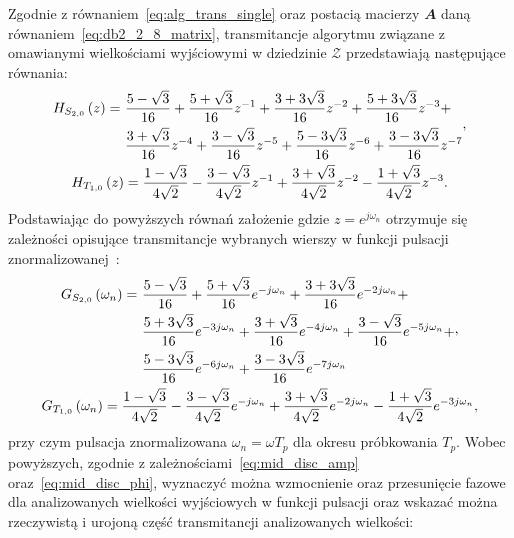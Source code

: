 Zgodnie z równaniem~\eqref{eq:alg_trans_single} oraz postacią macierzy $\mathbfit{A}$ daną równaniem~\eqref{eq:db2_2_8_matrix}, transmitancje algorytmu związane z omawianymi wielkościami wyjściowymi w dziedzinie $\mathcal{Z}$ przedstawiają następujące równania:
\begin{gather}
\begin{split}
H_{S_{2,0}} \left(z\right) = ~
& \frac{5 - \sqrt{3}}{16} + \frac{5 + \sqrt{3}}{16} z^{-1} + \frac{3 + 3 \sqrt{3}}{16} z^{-2} + \frac{5 + 3 \sqrt{3}}{16} z^{-3} + \\
& \frac{3 + \sqrt{3}}{16} z^{-4} + \frac{3 - \sqrt{3}}{16} z^{-5} + \frac{5 - 3 \sqrt{3}}{16} z^{-6} + \frac{3 - 3 \sqrt{3}}{16} z^{-7}
\end{split}
\label{eq:sym_partd_output_trans_z_S_2_0}, \\
H_{T_{1,0}} \left(z\right) = \frac{1 - \sqrt{3}}{4 \sqrt{2}} - \frac{3 - \sqrt{3}}{4 \sqrt{2}} z^{-1} + \frac{3 + \sqrt{3}}{4 \sqrt{2}} z^{-2} - \frac{1 + \sqrt{3}}{4 \sqrt{2}} z^{-3} \label{eq:sym_partd_output_trans_z_T_1_0}.
\end{gather}
Podstawiając do powyższych równań założenie gdzie $z = e^{j\omega_{n}}$ otrzymuje się zależności opisujące transmitancje wybranych wierszy w funkcji pulsacji znormalizowanej~\cite{oppenheim_dsp}:
\begin{gather}
\begin{split}
G_{S_{2,0}} \left(\omega_{n}\right) = ~
& \frac{5 - \sqrt{3}}{16} + \frac{5 + \sqrt{3}}{16} e^{-j\omega_{n}} + \frac{3 + 3 \sqrt{3}}{16} e^{-2j\omega_{n}} + \\
& \frac{5 + 3 \sqrt{3}}{16} e^{-3j\omega_{n}} + \frac{3 + \sqrt{3}}{16} e^{-4j\omega_{n}} + \frac{3 - \sqrt{3}}{16} e^{-5j\omega_{n}} + \\
& \frac{5 - 3 \sqrt{3}}{16} e^{-6j\omega_{n}} + \frac{3 - 3 \sqrt{3}}{16} e^{-7j\omega_{n}}
\end{split}
\label{eq:sym_partd_output_trans_wn_S_2_0}, \\
G_{T_{1,0}} \left(\omega_{n}\right) = \frac{1 - \sqrt{3}}{4 \sqrt{2}} - \frac{3 - \sqrt{3}}{4 \sqrt{2}} e^{-j\omega_{n}} + \frac{3 + \sqrt{3}}{4 \sqrt{2}} e^{-2j\omega_{n}} - \frac{1 + \sqrt{3}}{4 \sqrt{2}} e^{-3j\omega_{n}} \label{eq:sym_partd_output_trans_wn_T_1_0},
\end{gather}
przy czym pulsacja znormalizowana $\omega_{n} = \omega T_{p}$ dla okresu próbkowania $T_{p}$. Wobec powyższych, zgodnie z zależnościami~\eqref{eq:mid_disc_amp} oraz~\eqref{eq:mid_disc_phi}, wyznaczyć można wzmocnienie oraz przesunięcie fazowe dla analizowanych wielkości wyjściowych w funkcji pulsacji oraz wskazać można rzeczywistą i urojoną część transmitancji analizowanych wielkości:
